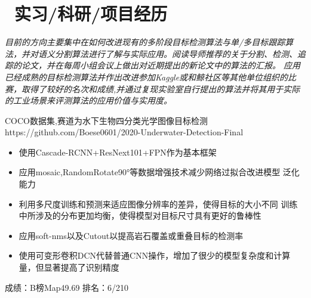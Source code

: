 \documentclass{resume}
\begin{document}
\section{\faUsers\ 实习/科研/项目经历}
\textit{目前的方向主要集中在如何改进现有的多阶段目标检测算法与单/多目标跟踪算法，并对语义分割算法进行了解与实际应用。阅读导师推荐的关于分割、检测、追踪的论文，并在每周小组会议上做出对近期提出的新论文中的算法的汇报。
	应用已经成熟的目标检测算法并作出改进参加Kaggle或和鲸社区等其他单位组织的比赛，取得了较好的名次和成绩,并通过复现实验室自行提出的算法并将其用于实际的工业场景来评测算法的应用价值与实用度。
}

\begin{onehalfspacing}
COCO数据集,赛道为水下生物四分类光学图像目标检测\\https://github.com/Boese0601/2020-Underwater-Detection-Final
\begin{itemize}
  \item 使用Cascade-RCNN+ResNext101+FPN作为基本框架
  \item 应用mosaic,RandomRotate90°等数据增强技术减少网络过拟合改进模型
  泛化能力
  \item 利用多尺度训练和预测来适应图像分辨率的差异，使得目标的大小不同
  训练中所涉及的分布更加均衡，使得模型对目标尺寸具有更好的鲁棒性
  \item 应用soft-nms以及Cutout以提高岩石覆盖或重叠目标的检测率
  \item 使用可变形卷积DCN代替普通CNN操作，增加了很少的模型复杂度和计算量，但显著提高了识别精度
\end{itemize}
成绩：B榜Map49.69 排名：6/210
\end{onehalfspacing}
\end{document}
